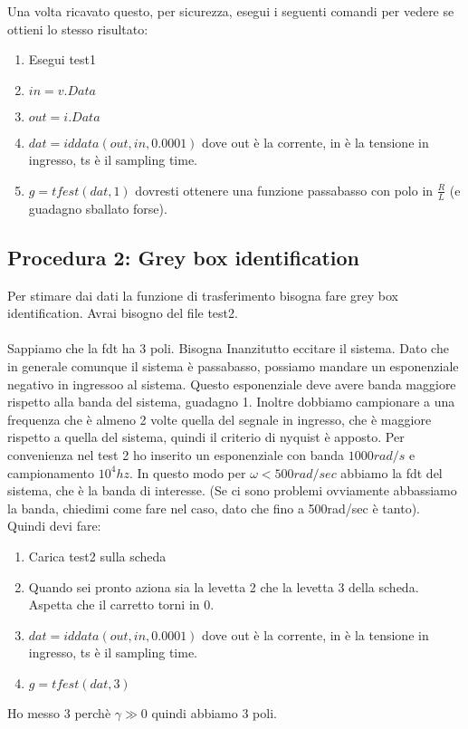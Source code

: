 \documentclass[10pt,a4paper]{article}
\begin{document}
Una volta ricavato questo, per sicurezza,  esegui i seguenti comandi per vedere se ottieni lo stesso risultato:
\begin{enumerate}
\item Esegui test1
\item $in=v.Data$
\item $out = i.Data$
\item $dat = iddata(out,in, 0.0001)$ dove out è la corrente, in è la tensione in ingresso, ts è il sampling time.
\item $g = tfest(dat, 1)$ dovresti ottenere una funzione passabasso con polo in $\frac{R}{L}$ (e guadagno sballato forse).
\end{enumerate}

\subsection{Procedura 2: Grey box identification}
Per stimare dai dati la funzione di trasferimento bisogna fare grey box identification. Avrai bisogno del file test2.\\ \\Sappiamo che la fdt ha 3 poli. Bisogna Inanzitutto eccitare il sistema. Dato che in generale comunque il sistema è passabasso, possiamo mandare un esponenziale negativo in ingressoo al sistema. Questo esponenziale deve avere banda maggiore rispetto alla banda del sistema, guadagno 1. Inoltre dobbiamo campionare a una frequenza che è almeno 2 volte quella del segnale in ingresso, che è maggiore rispetto a quella del sistema, quindi il criterio di nyquist è apposto. Per convenienza nel test 2 ho inserito un esponenziale con banda $1000rad/s$ e campionamento $10^4 hz$. In questo modo per $\omega < 500 rad/sec$ abbiamo la fdt del sistema, che è la banda di interesse. (Se ci sono problemi ovviamente abbassiamo la banda, chiedimi come fare nel caso, dato che fino a 500rad/sec è tanto). \\
Quindi devi fare:
\begin{enumerate}
\item Carica test2 sulla scheda
\item Quando sei pronto aziona sia la levetta 2 che la levetta 3 della scheda. Aspetta che il carretto torni in 0.
\item $dat = iddata(out,in, 0.0001)$ dove out è la corrente, in è la tensione in ingresso, ts è il sampling time.
\item $g = tfest(dat, 3)$
\end{enumerate}
Ho messo $3$ perchè $\gamma \gg 0$ quindi abbiamo $3$ poli.
\end{document}
